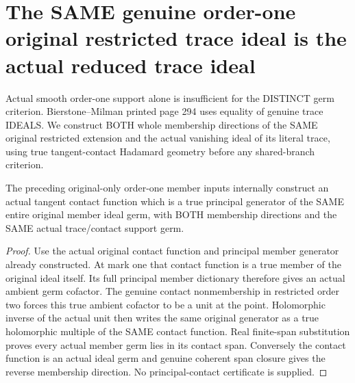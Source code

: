 \section{The SAME genuine order-one original restricted trace ideal is the actual reduced trace ideal}

Actual smooth order-one support alone is insufficient for the DISTINCT germ
criterion. Bierstone--Milman printed page 294 uses equality of genuine trace
IDEALS. We construct BOTH whole membership directions of the SAME original
restricted extension and the actual vanishing ideal of its literal trace,
using true tangent-contact Hadamard geometry before any shared-branch criterion.

\begin{theorem}
\label{hir:sharp-original-order-one-contact-whole-member-principal-generator}
\leanok
The preceding original-only order-one member inputs internally construct an
actual tangent contact function which is a true principal generator of the
SAME entire original member ideal germ, with BOTH membership directions and
the SAME actual trace/contact support germ.
\end{theorem}
\begin{proof}
Use the actual original contact function and principal member generator already
constructed. At mark one that contact function is a true member of the original
ideal itself. Its full principal member dictionary therefore gives an actual
ambient germ cofactor. The genuine contact nonmembership in restricted order
two forces this true ambient cofactor to be a unit at the point. Holomorphic
inverse of the actual unit then writes the same original generator as a true
holomorphic multiple of the SAME contact function. Real finite-span substitution
proves every actual member germ lies in its contact span. Conversely the contact
function is an actual ideal germ and genuine coherent span closure gives the
reverse membership direction. No principal-contact certificate is supplied.
\end{proof}

